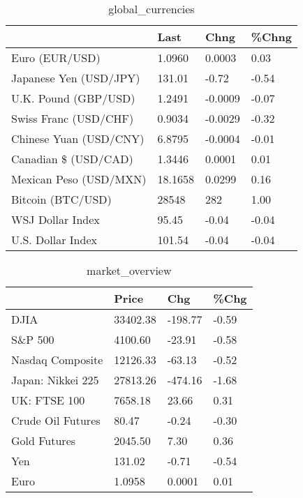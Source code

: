 \documentclass{article}%
\begin{document}
%


\begin{table}[htbp]%
\caption{global\_currencies}%
\centering%
\begin{adjustbox}{width=1\textwidth}%
\begin{tabular}{llll}
\toprule
                       &    Last &    Chng & \%Chng \\
\midrule
        Euro (EUR/USD) &  1.0960 &  0.0003 &  0.03 \\
Japanese Yen (USD/JPY) &  131.01 &   -0.72 & -0.54 \\
  U.K. Pound (GBP/USD) &  1.2491 & -0.0009 & -0.07 \\
 Swiss Franc (USD/CHF) &  0.9034 & -0.0029 & -0.32 \\
Chinese Yuan (USD/CNY) &  6.8795 & -0.0004 & -0.01 \\
  Canadian \$ (USD/CAD) &  1.3446 &  0.0001 &  0.01 \\
Mexican Peso (USD/MXN) & 18.1658 &  0.0299 &  0.16 \\
     Bitcoin (BTC/USD) &   28548 &     282 &  1.00 \\
      WSJ Dollar Index &   95.45 &   -0.04 & -0.04 \\
     U.S. Dollar Index &  101.54 &   -0.04 & -0.04 \\
\bottomrule
\end{tabular}
%
\end{adjustbox}%
\end{table}

%


\begin{table}[htbp]%
\caption{market\_overview}%
\centering%
\begin{adjustbox}{width=1\textwidth}%
\begin{tabular}{llll}
\toprule
                  &    Price &     Chg &  \%Chg \\
\midrule
             DJIA & 33402.38 & -198.77 & -0.59 \\
          S\&P 500 &  4100.60 &  -23.91 & -0.58 \\
 Nasdaq Composite & 12126.33 &  -63.13 & -0.52 \\
Japan: Nikkei 225 & 27813.26 & -474.16 & -1.68 \\
     UK: FTSE 100 &  7658.18 &   23.66 &  0.31 \\
Crude Oil Futures &    80.47 &   -0.24 & -0.30 \\
     Gold Futures &  2045.50 &    7.30 &  0.36 \\
              Yen &   131.02 &   -0.71 & -0.54 \\
             Euro &   1.0958 &  0.0001 &  0.01 \\
\bottomrule
\end{tabular}
%
\end{adjustbox}%
\end{table}

%
\end{document}
